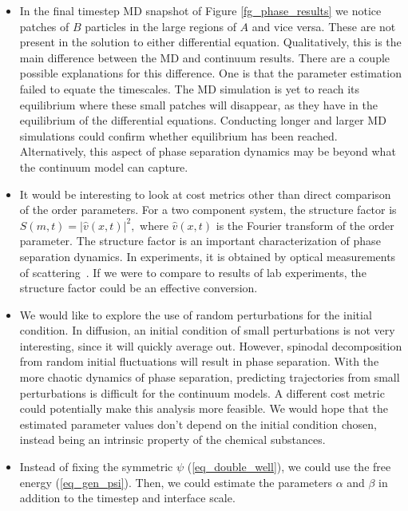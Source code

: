 \documentclass[12pt, reqno]{report}
\theoremstyle{definition}
\theoremstyle{remark}
\begin{document}
\begin{itemize}

\item In the final timestep MD snapshot of Figure \ref{fg_phase_results} we notice patches of $B$ particles in the large regions of $A$ and vice versa.
These are not present in the solution to either differential equation.
Qualitatively, this is the main difference between the MD and continuum results.
There are a couple possible explanations for this difference.
One is that the parameter estimation failed to equate the timescales. 
The MD simulation is yet to reach its equilibrium where these small patches will disappear, as they have in the equilibrium of the differential equations.
Conducting longer and larger MD simulations could confirm whether equilibrium has been reached.
Alternatively, this aspect of phase separation dynamics may be beyond what the continuum model can capture.


\item It would be interesting to look at cost metrics other than direct comparison of the order parameters.
For a two component system, the structure factor is 
    $S(m,t) = |\widehat v(x,t)|^2,$
where $\widehat v(x,t)$ is the Fourier transform of the order parameter.
The structure factor is an important characterization of phase separation dynamics.
In experiments, it is obtained by optical measurements of 
scattering~\cite{copetti_1990_kinetics}.
If we were to compare to results of lab experiments, the structure factor could be an effective conversion.

\item We would like to explore the use of random perturbations for the initial condition. 
In diffusion, an initial condition of small perturbations is not very interesting, since it will quickly average out.
However, spinodal decomposition from random initial fluctuations will result in phase separation.
With the more chaotic dynamics of phase separation, predicting trajectories from small perturbations is difficult for the continuum models.
A different cost metric could potentially make this analysis more feasible.
We would hope that the estimated parameter values don't depend on the initial condition chosen, instead being an intrinsic property of the chemical substances.

\item Instead of fixing the symmetric $\psi$ (\ref{eq_double_well}), we could use the free energy (\ref{eq_gen_psi}).
Then, we could estimate the parameters $\alpha$ and $\beta$ in addition to the timestep and interface scale.


\end{itemize}
\end{document}
